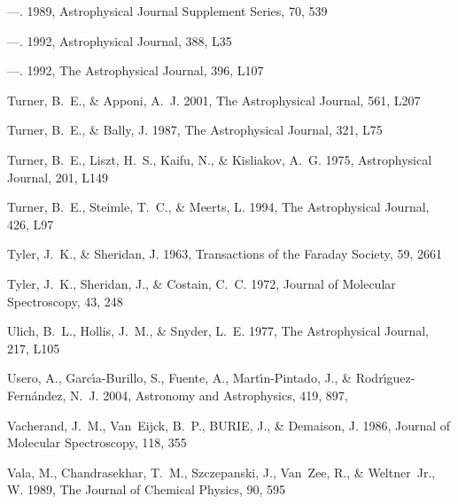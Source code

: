 \documentclass[twocolumn]{aastex631}
\begin{document}
\begin{thebibliography}{}
---. 1989, Astrophysical Journal Supplement Series, 70, 539

---. 1992{}, Astrophysical Journal, 388, L35

---. 1992{}, The Astrophysical Journal, 396, L107

Turner, B.~E., \& Apponi, A.~J. 2001, The Astrophysical Journal, 561, L207

Turner, B.~E., \& Bally, J. 1987, The Astrophysical Journal, 321, L75

Turner, B.~E., Liszt, H.~S., Kaifu, N., \& Kisliakov, A.~G. 1975, Astrophysical
  Journal, 201, L149

Turner, B.~E., Steimle, T.~C., \& Meerts, L. 1994, The Astrophysical Journal,
  426, L97

Tyler, J.~K., \& Sheridan, J. 1963, Transactions of the Faraday Society, 59,
  2661

Tyler, J.~K., Sheridan, J., \& Costain, C.~C. 1972, Journal of Molecular
  Spectroscopy, 43, 248

Ulich, B.~L., Hollis, J.~M., \& Snyder, L.~E. 1977, The Astrophysical Journal,
  217, L105

{Usero}, A., {Garc{\'\i}a-Burillo}, S., {Fuente}, A., {Mart{\'\i}n-Pintado},
  J., \& {Rodr{\'\i}guez-Fern{\'a}ndez}, N.~J. 2004, Astronomy and
  Astrophysics, 419, 897, 

Vacherand, J.~M., Van~Eijck, B.~P., BURIE, J., \& Demaison, J. 1986, Journal of
  Molecular Spectroscopy, 118, 355

Vala, M., Chandrasekhar, T.~M., Szczepanski, J., Van~Zee, R., \& Weltner~Jr.,
  W. 1989, The Journal of Chemical Physics, 90, 595


\end{thebibliography}
\end{document}
